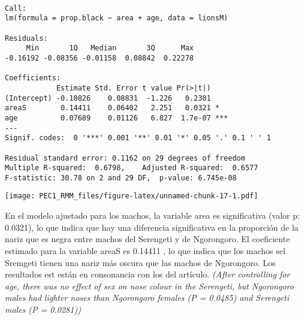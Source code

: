 \documentclass[
]{article}
\begin{document}
\begin{verbatim}

Call:
lm(formula = prop.black ~ area + age, data = lionsM)

Residuals:
     Min       1Q   Median       3Q      Max 
-0.16192 -0.08356 -0.01158  0.08842  0.22278 

Coefficients:
            Estimate Std. Error t value Pr(>|t|)    
(Intercept) -0.10826    0.08831  -1.226   0.2301    
areaS        0.14411    0.06402   2.251   0.0321 *  
age          0.07689    0.01126   6.827  1.7e-07 ***
---
Signif. codes:  0 '***' 0.001 '**' 0.01 '*' 0.05 '.' 0.1 ' ' 1

Residual standard error: 0.1162 on 29 degrees of freedom
Multiple R-squared:  0.6798,    Adjusted R-squared:  0.6577 
F-statistic: 30.78 on 2 and 29 DF,  p-value: 6.745e-08
\end{verbatim}

\texttt{[image: PEC1\_RMM\_files/figure-latex/unnamed-chunk-17-1.pdf]}

En el modelo ajustado para los machos, la variable area es significativa
(valor p: 0.0321), lo que indica que hay una diferencia significativa en
la proporción de la nariz que es negra entre machos del Serengeti y de
Ngorongoro. El coeficiente estimado para la variable areaS es 0.14411 ,
lo que indica que los machos sel Sremgeti tienen una nariz más oscura
que las machos de Ngorongoro. Los resultados est están en consonancia
con los del artículo. \emph{(After controlling for age, there was no
effect of sex on nose colour in the Serengeti, but Ngorongoro males had
lighter noses than Ngorongoro females (P = 0.0485) and Serengeti males
(P = 0.0281))}
\end{document}
